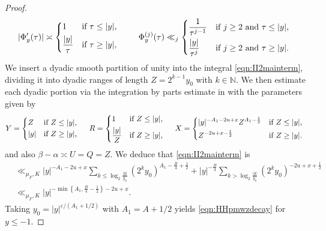 \documentclass[11pt,a4paper]{amsart}
\newcommand{\e}{\varepsilon}
\newcommand{\N}{\mathbb{N}}
\numberwithin{equation}{section}
\theoremstyle{remark}
\theoremstyle{definition}
\begin{document}
\begin{proof}
\[|\Phi_y'(\tau)| \asymp \begin{dcases*}
1 & if $\tau \leq |y|$,	\\
\frac{|y|}{\tau} & if $\tau \geq |y|$,
\end{dcases*} \qquad \Phi_y^{(j)}(\tau) \ll_j \begin{dcases*}
\frac{1}{\tau^{j - 1}} & if $j \geq 2$ and $\tau \leq |y|$,	\\
\frac{|y|}{\tau^j} & if $j \geq 2$ and $\tau \geq |y|$.
\end{dcases*}\]
We insert a dyadic smooth partition of unity into the integral \eqref{eqn:II2mainterm}, dividing it into dyadic ranges of length $Z = 2^{k - 1} y_0$ with $k \in \N$. We then estimate each dyadic portion via the integration by parts estimate in \cite[Lemma 2]{BK19} with the parameters given by
\[Y = \begin{dcases*}
Z & if $Z \leq |y|$,	\\
|y| & if $Z \geq |y|$,
\end{dcases*} \quad R = \begin{dcases*}
1 & if $Z \leq |y|$,	\\
\frac{|y|}{Z} & if $Z \geq |y|$,
\end{dcases*} \quad X = \begin{dcases*}
|y|^{-A_1 - 2u + x} Z^{A_1 - \frac{1}{2}} & if $Z \leq |y|$,	\\
Z^{-2u + x - \frac{1}{2}} & if $Z \geq |y|$.
\end{dcases*}\]
and also $\beta - \alpha \asymp U = Q = Z$. We deduce that \eqref{eqn:II2mainterm} is
\begin{align*}
& \ll_{\mu_F,K} |y|^{-A_1 - 2u + x} \sum_{k \leq \log_2 \frac{|y|}{y_0}} (2^k y_0)^{A_1 - \frac{B}{4} + \frac{1}{2}} + |y|^{-\frac{B}{4}} \sum_{k > \log_2 \frac{|y|}{y_0}} (2^k y_0)^{-2u + x + \frac{1}{2}}	\\
& \ll_{\mu_F,K} |y|^{-\min\left\{A_1,\frac{B}{4} - \frac{1}{2}\right\} - 2u + x}.
\end{align*}
Taking $y_0 = |y|^{\e/(A_1 + 1/2)}$ with $A_1 = A + 1/2$ yields \eqref{eqn:HHpmwzdecay} for $y \leq -1$.


\end{proof}
\end{document}
